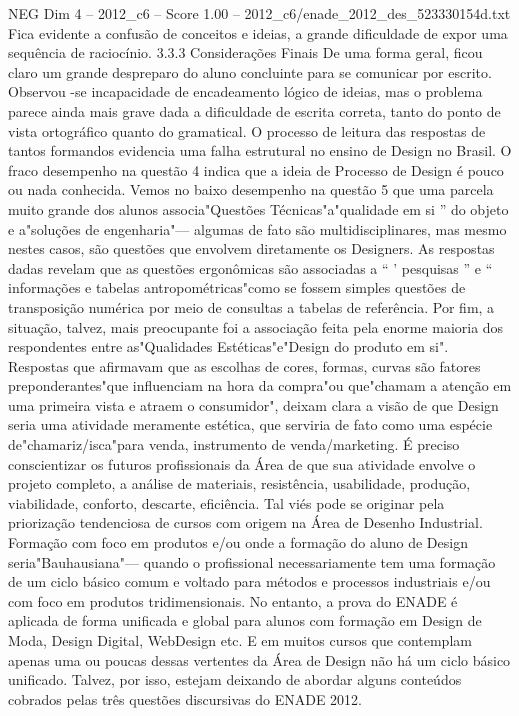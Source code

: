 \begin{textsample}{NEG Dim 4 – 2012\_c6 – Score 1.00 – 2012\_c6/enade\_2012\_des\_523330154d.txt}
Fica evidente a confusão de conceitos e ideias, a grande dificuldade de expor uma sequência de raciocínio. 3.3.3 Considerações Finais De uma forma geral, ficou claro um grande despreparo do aluno concluinte para se comunicar por escrito.
Observou -se incapacidade de encadeamento lógico de ideias, mas o problema parece ainda mais grave dada a dificuldade de escrita correta, tanto do ponto de vista ortográfico quanto do gramatical.
O processo de leitura das respostas de tantos formandos evidencia uma falha estrutural no ensino de Design no Brasil.
O fraco desempenho na questão 4 indica que a ideia de Processo de Design é pouco ou nada conhecida.
Vemos no baixo desempenho na questão 5 que uma parcela muito grande dos alunos associa"Questões Técnicas"a"qualidade em si ” do objeto e a"soluções de engenharia"— algumas de fato são multidisciplinares, mas mesmo nestes casos, são questões que envolvem diretamente os Designers.
As respostas dadas revelam que as questões ergonômicas são associadas a “ ' pesquisas ” e “ informações e tabelas antropométricas"como se fossem simples questões de transposição numérica por meio de consultas a tabelas de referência.
Por fim, a situação, talvez, mais preocupante foi a associação feita pela enorme maioria dos respondentes entre as"Qualidades Estéticas"e"Design do produto em si".
Respostas que afirmavam que as escolhas de cores, formas, curvas são fatores preponderantes"que influenciam na hora da compra"ou que"chamam a atenção em uma primeira vista e atraem o consumidor", deixam clara a visão de que Design seria uma atividade meramente estética, que serviria de fato como uma espécie de"chamariz/isca"para venda, instrumento de venda/marketing.
É preciso conscientizar os futuros profissionais da Área de que sua atividade envolve o projeto completo, a análise de materiais, resistência, usabilidade, produção, viabilidade, conforto, descarte, eficiência.
Tal viés pode se originar pela priorização tendenciosa de cursos com origem na Área de Desenho Industrial.
Formação com foco em produtos e/ou onde a formação do aluno de Design seria"Bauhausiana"— quando o profissional necessariamente tem uma formação de um ciclo básico comum e voltado para métodos e processos industriais e/ou com foco em produtos tridimensionais.
No entanto, a prova do ENADE é aplicada de forma unificada e global para alunos com formação em Design de Moda, Design Digital, WebDesign etc.
E em muitos cursos que contemplam apenas uma ou poucas dessas vertentes da Área de Design não há um ciclo básico unificado.
Talvez, por isso, estejam deixando de abordar alguns conteúdos cobrados pelas três questões discursivas do ENADE 2012.

\end{textsample}
